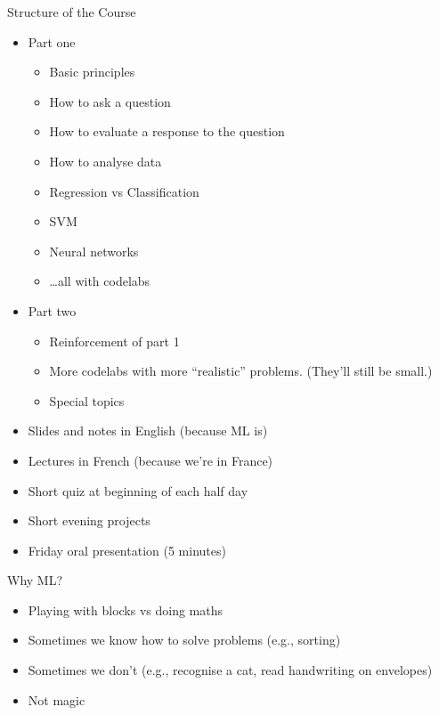 




Structure of the Course
\begin{itemize}
\item Part one
  \begin{itemize}
  \item Basic principles
  \item How to ask a question
  \item How to evaluate a response to the question
  \item How to analyse data
  \item Regression vs Classification
  \item SVM
  \item Neural networks
  \item \dots all with codelabs
  \end{itemize}
\item Part two
  \begin{itemize}
  \item Reinforcement of part 1
  \item More codelabs with more ``realistic'' problems.  (They'll still be small.)
  \item Special topics
  \end{itemize}
\item Slides and notes in English (because ML is)
\item Lectures in French (because we're in France)
\item Short quiz at beginning of each half day
\item Short evening projects
\item Friday oral presentation (5 minutes)
\end{itemize}

Why ML?
\begin{itemize}
\item Playing with blocks vs doing maths
\item Sometimes we know how to solve problems (e.g., sorting)
\item Sometimes we don't (e.g., recognise a cat, read handwriting on envelopes)
\item Not magic
\end{itemize}

